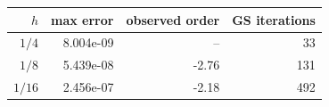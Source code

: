 \begin{tabular}{r r r r}\hline
$h$ & max error & observed order & GS iterations \\
\hline
$1/4$ & 8.004e-09 & -- & 33 \\
$1/8$ & 5.439e-08 & -2.76 & 131 \\
$1/16$ & 2.456e-07 & -2.18 & 492 \\
\hline
\end{tabular}
